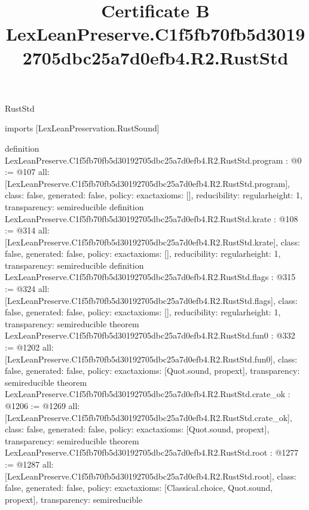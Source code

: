\begin{lexlean}{RustStd}
\title{Certificate B LexLeanPreserve.C1f5fb70fb5d30192705dbc25a7d0efb4.R2.RustStd}
\begin{coremodule}
imports [LexLeanPreservation.RustSound]

definition LexLeanPreserve.C1f5fb70fb5d30192705dbc25a7d0efb4.R2.RustStd.program : @0 := @107 {
  all: [LexLeanPreserve.C1f5fb70fb5d30192705dbc25a7d0efb4.R2.RustStd.program],
  class: false,
  generated: false,
  policy: exact{axioms: []},
  reducibility: regular{height: 1},
  transparency: semireducible
}
definition LexLeanPreserve.C1f5fb70fb5d30192705dbc25a7d0efb4.R2.RustStd.krate : @108 := @314 {
  all: [LexLeanPreserve.C1f5fb70fb5d30192705dbc25a7d0efb4.R2.RustStd.krate],
  class: false,
  generated: false,
  policy: exact{axioms: []},
  reducibility: regular{height: 1},
  transparency: semireducible
}
definition LexLeanPreserve.C1f5fb70fb5d30192705dbc25a7d0efb4.R2.RustStd.flags : @315 := @324 {
  all: [LexLeanPreserve.C1f5fb70fb5d30192705dbc25a7d0efb4.R2.RustStd.flags],
  class: false,
  generated: false,
  policy: exact{axioms: []},
  reducibility: regular{height: 1},
  transparency: semireducible
}
theorem LexLeanPreserve.C1f5fb70fb5d30192705dbc25a7d0efb4.R2.RustStd.fun0 : @332 := @1202 {
  all: [LexLeanPreserve.C1f5fb70fb5d30192705dbc25a7d0efb4.R2.RustStd.fun0],
  class: false,
  generated: false,
  policy: exact{axioms: [Quot.sound, propext]},
  transparency: semireducible
}
theorem LexLeanPreserve.C1f5fb70fb5d30192705dbc25a7d0efb4.R2.RustStd.crate_ok : @1206 := @1269 {
  all: [LexLeanPreserve.C1f5fb70fb5d30192705dbc25a7d0efb4.R2.RustStd.crate_ok],
  class: false,
  generated: false,
  policy: exact{axioms: [Quot.sound, propext]},
  transparency: semireducible
}
theorem LexLeanPreserve.C1f5fb70fb5d30192705dbc25a7d0efb4.R2.RustStd.root : @1277 := @1287 {
  all: [LexLeanPreserve.C1f5fb70fb5d30192705dbc25a7d0efb4.R2.RustStd.root],
  class: false,
  generated: false,
  policy: exact{axioms: [Classical.choice, Quot.sound, propext]},
  transparency: semireducible
}


\end{coremodule}
\end{lexlean}
